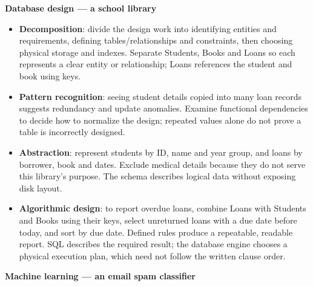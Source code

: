 \documentclass[a4paper,12pt]{article}
\begin{document}
\textbf{Database design --- a school library}
\begin{itemize}
    \item \textbf{Decomposition}: divide the design work into identifying entities and requirements, defining tables/relationships and constraints, then choosing physical storage and indexes. Separate Students, Books and Loans so each represents a clear entity or relationship; Loans references the student and book using keys.
    \item \textbf{Pattern recognition}: seeing student details copied into many loan records suggests redundancy and update anomalies. Examine functional dependencies to decide how to normalize the design; repeated values alone do not prove a table is incorrectly designed.
    \item \textbf{Abstraction}: represent students by ID, name and year group, and loans by borrower, book and dates. Exclude medical details because they do not serve this library's purpose. The schema describes logical data without exposing disk layout.
    \item \textbf{Algorithmic design}: to report overdue loans, combine Loans with Students and Books using their keys, select unreturned loans with a due date before today, and sort by due date. Defined rules produce a repeatable, readable report. SQL describes the required result; the database engine chooses a physical execution plan, which need not follow the written clause order.
\end{itemize}

\textbf{Machine learning --- an email spam classifier}
\end{document}

